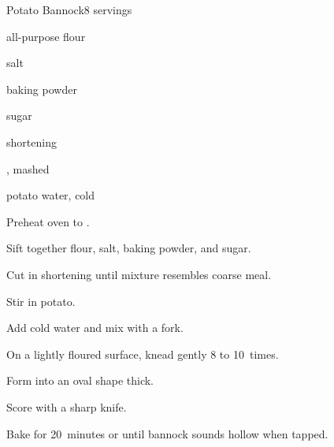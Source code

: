 \begin{recipe}{Potato Bannock}{}{8 servings}

\begin{ingredients}
\item \C{2\third} all-purpose flour
\item {} salt
\item {} baking powder
\item {} sugar
\item {} shortening
\item \C{\threequarter} , mashed
\item {} potato water, cold
\end{ingredients}

\begin{directions}
\item Preheat oven to .
\item Sift together flour, salt, baking powder, and sugar.
\item Cut in shortening until mixture resembles coarse meal.
\item Stir in potato.
\item Add cold water and mix with a fork.
\item On a lightly floured surface, knead gently 8 to 10~times.
\item Form into an oval shape \inch{\threequarter} thick.
\item Score with a sharp knife.
\item Bake for 20~minutes or until bannock sounds hollow when tapped.
\end{directions}

\end{recipe}
